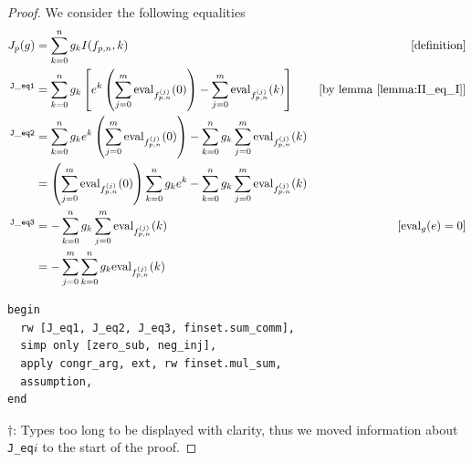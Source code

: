 \documentclass{report}
\theoremstyle{definition}
\begin{document}
\begin{proof}
We consider the following equalities
\begin{equation}\nonumber
\begin{aligned}
J_p(g)&=\sum_{k=0}^ng_k I(f_{p,n}, k) & [\text{definition}]\\
{}^{\tt J\_eq1}&=\sum_{k=0}^ng_k\left[e^k\left(\sum_{j=0}^m\mathrm{eval}_{f_{p,n}^{(j)}}(0)\right)-\sum_{j=0}^m\mathrm{eval}_{f_{p,n}^{(j)}}(k)\right] & [\text{by lemma \ref{lemma:II_eq_I}}]\\
{}^{\tt J\_eq2}&=\sum_{k=0}^ng_ke^k\left(\sum_{j=0}^m\mathrm{eval}_{f_{p,n}^{(j)}}(0)\right)-\sum_{k=0}^ng_k\sum_{j=0}^m\mathrm{eval}_{f_{p,n}^{(j)}}(k) \\
&=\left(\sum_{j=0}^m\mathrm{eval}_{f_{p,n}^{(j)}}(0)\right)\sum_{k=0}^ng_ke^k-\sum_{k=0}^ng_k\sum_{j=0}^m\mathrm{eval}_{f_{p,n}^{(j)}}(k) \\
{}^{\tt J\_eq3}&=-\sum_{k=0}^ng_k\sum_{j=0}^m\mathrm{eval}_{f_{p,n}^{(j)}}(k) & [\mathrm{eval}_g(e)=0]\\
&=-\sum_{j=0}^m\sum_{k=0}^ng_k\mathrm{eval}_{f_{p,n}^{(j)}}(k)
\end{aligned}
\end{equation}
\begin{verbatim}
begin
  rw [J_eq1, J_eq2, J_eq3, finset.sum_comm], 
  simp only [zero_sub, neg_inj],
  apply congr_arg, ext, rw finset.mul_sum,
  assumption,
end
\end{verbatim}
$\dagger$: Types too long to be displayed with clarity, thus we moved information about {\tt J\_eq$i$} to the start of the proof. 
\end{proof}
\end{document}
